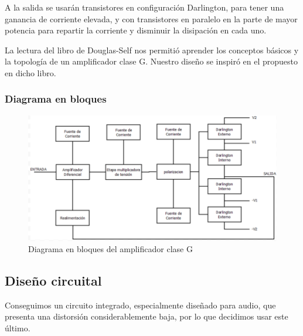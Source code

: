 \documentclass[a4paper,12pt,twoside]{article}
\begin{document}
A la salida se usarán transistores en configuración Darlington, para tener una ganancia de corriente elevada, y con transistores en paralelo en la parte de mayor potencia para repartir la corriente y disminuir la disipación en cada uno.

La lectura del libro de Douglas-Self nos permitió aprender los conceptos básicos y la topología de un amplificador clase G. Nuestro diseño se inspiró en el propuesto en dicho libro.



\subsubsection{Diagrama en bloques}



\begin{figure}[H]
	\centering
	\includegraphics[scale=0.75]{img/ampli_bloques}
	\caption{Diagrama en bloques del amplificador clase G}
	\label{fig:ampli_bloques}
\end{figure}




\subsection{Diseño circuital}

Conseguimos un circuito integrado, especialmente diseñado para audio, que presenta una distorsión considerablemente baja, por lo que decidimos usar este último.
\end{document}

